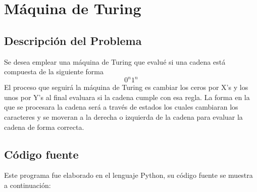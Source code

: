 \documentclass[12pt]{article}
\begin{document}
\newpage
\section{Máquina de Turing}
\subsection{Descripción del Problema}

Se desea emplear una máquina de Turing que evalué si una cadena está compuesta de la siguiente forma \[0^{n}1^{n}\]El proceso que seguirá la máquina de Turing es cambiar los ceros por X’s y los unos por Y’s al final evaluara si la cadena cumple con esa regla. La forma en la que se procesara la cadena será a través de estados los cuales cambiaran los caracteres y se moveran a la derecha o izquierda de la cadena para evaluar la cadena de forma correcta.

\subsection{Código fuente}
Este programa fue elaborado en el lenguaje Python, su código fuente se muestra a continuación:
\end{document}
